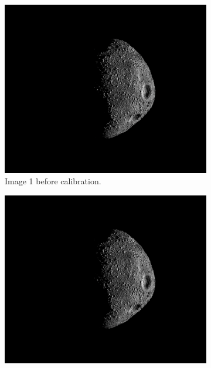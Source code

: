 \begin{figure}[htb]
    \centering
        \begin{subfigure}[b]{0.48\textwidth}
            \centering
                \includegraphics[width=\textwidth]{doc/thesis/0_figures/procedural_terrain/50_10_Inst_2017-08-15T115755-845000.png}
                \caption{Image 1 before calibration.}
                \label{fig:composition_before_1}
        \end{subfigure}
        \begin{subfigure}[b]{0.48\textwidth}
            \centering
                \includegraphics[width=\textwidth]{doc/thesis/0_figures/procedural_terrain/50_10_Inst_2017-08-15T115755-845000.png}

\end{subfigure}
\end{figure}
